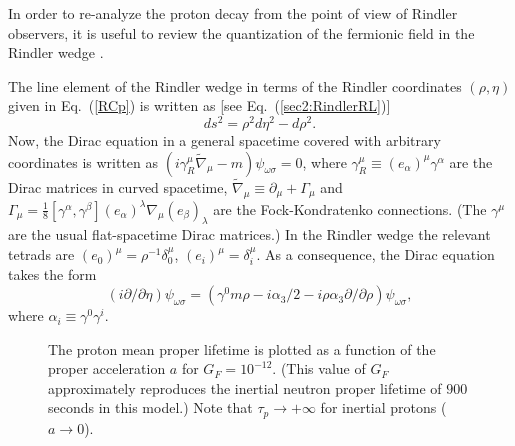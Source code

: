 \documentclass[12pt,nofootinbib,floatfix,aps,prd,showpacs,amsmath,amssymb,eqsecnum]{revtex4-2}
\let\cite\citep
\begin{document}
In order to re-analyze the proton decay from the point of view of
Rindler observers, it is useful to review  the 
quantization of the fermionic field in the Rindler wedge
\cite{Candelasetal78,Soffeletal80,Jareguietal91,Bautista93}. 

The line element of the Rindler wedge in terms of the Rindler 
coordinates $(\rho,\eta)$ given in Eq.~(\ref{RCp}) is written as 
[see Eq.~(\ref{sec2:RindlerRL})]
\begin{equation}
ds^2 = \rho^2 d\eta^2 - d\rho^2  .
\label{LEp}
\end{equation}
Now, the Dirac equation in a general spacetime covered 
with arbitrary coordinates is written as 
$ (i\gamma_R^\mu \tilde \nabla_\mu -m) \psi_{\omega \sigma}=0$,
where
$\gamma_R^\mu \equiv (e_\alpha)^\mu \gamma^\alpha$
are the Dirac matrices in curved spacetime,
$\tilde \nabla_\mu \equiv \partial_\mu +\Gamma_\mu $
and 
$ \Gamma_\mu
= 
\frac{1}{8} [\gamma^\alpha,\gamma^\beta] (e_\alpha)^\lambda 
\nabla_\mu (e_\beta)_\lambda
$
are the 
Fock-Kondratenko connections. (The $\gamma^\mu$ are
the usual flat-spacetime Dirac matrices.) In the
Rindler wedge the relevant  tetrads are
$ (e_0)^{\mu}= \rho^{-1} \delta^\mu_0$, 
$ (e_i)^\mu = \delta^\mu_i$. 
As a consequence, the Dirac equation takes the form
\begin{equation}
(i {\partial }/{\partial \eta})\psi_{\omega \sigma}=
( 
\gamma^0 m\rho - {i \alpha_3}/{2} - 
i \rho \alpha_3 {\partial}/{\partial \rho}
)
\psi_{\omega \sigma},
\label{DEQ}
\end{equation}
where 
$\alpha_i \equiv \gamma^0 \gamma^i$. 
\begin{figure}
\begin{center}
\mbox{}
\end{center}
\caption{ 
The proton mean proper lifetime is plotted 
as a function of the proper acceleration $a$
for $G_F = 10^{-12}$. (This value of $G_F$
approximately reproduces the inertial neutron proper 
lifetime of $900$ seconds in this model.) 
Note that $\tau_p \to +\infty$ for inertial protons ($a \to 0$). 
}
\label{proton}
\end{figure}
\end{document}
